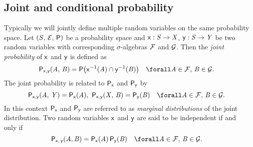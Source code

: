 
\subsection{Joint and conditional probability}\label{subsec:joint-and-conditional-probabilities}

Typically we will jointly define multiple random variables on the same probability space. Let $(\mathit{S},\,\mathcal{E},\,\mathsf{P})$ be a probability space and $\mathsf{x} : \mathit{S} \to \mathit{X}$, $\mathsf{y} : \mathit{S} \to \mathit{Y}$ be two random variables with corresponding $\sigma$-algebras $\mathcal{F}$ and $\mathcal{G}$. Then the \emph{joint probability} of $\mathsf{x}$ and $\mathsf{y}$ is defined as
\begin{equation}\label{eq:joint-probability-rvar}
  \prob{\rvar{x},\rvar{y}}(\set{A},\,\set{B}) = 
  \probability\lpa \rvar{x}^{-1}(\set{A}) \cap \rvar{y}^{-1}(\set{B})\rpa
  \quad \forall \set{A} \in \sset{F},\,\set{B} \in \sset{G}.
\end{equation}
The joint probability is related to $\mathsf{P}_{\mathsf{x}}$ and $\mathsf{P}_{\mathsf{y}}$ by
\begin{equation}\label{eq:sum-rule-rvar}
  \prob{\rvar{x},\rvar{y}}(\set{A},\,\set{Y}) =
  \prob{\rvar{x}}(\set{A}),~
  \prob{\rvar{x},\rvar{y}}(\set{X},\,\set{B}) =
  \prob{\rvar{y}}(\set{B})
  \quad \forall \set{A} \in \sset{F},\,\set{B} \in \sset{G}.
\end{equation}
In this context $\mathsf{P}_{\mathsf{x}}$ and $\mathsf{P}_{\mathsf{y}}$ are referred to as \emph{marginal distributions} of the joint distribution. Two random variables $\mathsf{x}$ and $\mathsf{y}$ are said to be independent if and only if
\begin{equation}\label{eq:independent-rvars}
  \prob{\rvar{x},\,\rvar{y}}(\set{A},\set{B}) = \prob{\rvar{x}}(\set{A})\,\prob{\rvar{y}}(\set{B})
  \quad \forall \set{A} \in \sset{F},\,\set{B} \in \sset{G}.
\end{equation}
